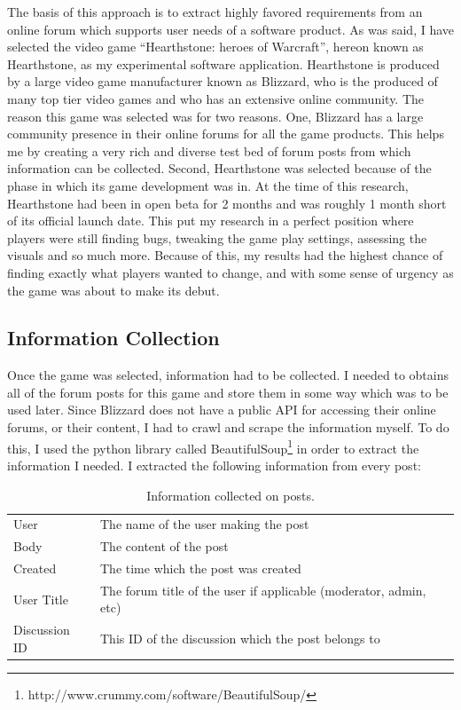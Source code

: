 \documentclass[conference]{IEEEtran}
\begin{document}
The basis of this approach is to extract highly favored requirements from an online forum which supports
user needs of a software product. As was said, I have selected the video game ``Hearthstone: heroes of Warcraft'',
hereon known as Hearthstone, as my experimental software application. Hearthstone is produced by a large
video game manufacturer known as Blizzard, who is the produced of many top tier video games and who has an
extensive online community. The reason this game was selected was for two reasons. One, Blizzard has a large
community presence in their online forums for all the game products. This helps me by creating a very
rich and diverse test bed of forum posts from which information can be collected. Second, Hearthstone was
selected because of the phase in which its game development was in. At the time of this research, Hearthstone
had been in open beta for 2 months and was roughly 1 month short of its official launch date. This put my
research in a perfect position where players were still finding bugs, tweaking the game play settings,
assessing the visuals and so much more. Because of this, my results had the highest chance of finding
exactly what players wanted to change, and with some sense of urgency as the game was about to make its
debut.

\subsection{Information Collection}

Once the game was selected, information had to be collected. I needed to obtains all of the forum posts
for this game and store them in some way which was to be used later. Since Blizzard does not have a public API
for accessing their online forums, or their content, I had to crawl and scrape the information myself. To
do this, I used the python library called BeautifulSoup\footnote{http://www.crummy.com/software/BeautifulSoup/}
 in order to extract the information I needed. I extracted
the following information from every post:

\begin{table}[h]
\begin{center}
\begin{tabular}{| l | p{6cm} |}
\hline
User & The name of the user making the post \\
Body & The content of the post \\
Created & The time which the post was created \\
User Title & The forum title of the user if applicable (moderator, admin, etc) \\
Discussion ID & This ID of the discussion which the post belongs to \\
\hline
\end{tabular}
\end{center}
\caption{Information collected on posts.\label{tab:posts}}
\end{table}
\end{document}
